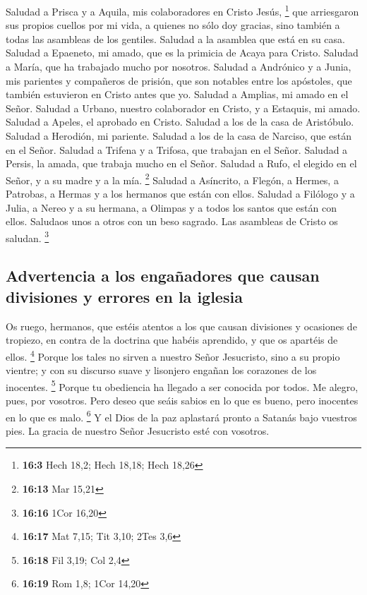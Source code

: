  Saludad a Prisca y a Aquila, mis colaboradores en Cristo
Jesús, \footnote{\textbf{16:3} Hech 18,2; Hech 18,18; Hech 18,26}
 que arriesgaron sus propios cuellos por mi vida, a
quienes no sólo doy gracias, sino también a todas las asambleas de los
gentiles.  Saludad a la asamblea que está en su casa.
Saludad a Epaeneto, mi amado, que es la primicia de Acaya para Cristo.
 Saludad a María, que ha trabajado mucho por nosotros.
 Saludad a Andrónico y a Junia, mis parientes y compañeros
de prisión, que son notables entre los apóstoles, que también estuvieron
en Cristo antes que yo.  Saludad a Amplias, mi amado en el
Señor.  Saludad a Urbano, nuestro colaborador en Cristo, y
a Estaquis, mi amado.  Saludad a Apeles, el aprobado en
Cristo. Saludad a los de la casa de Aristóbulo.  Saludad
a Herodión, mi pariente. Saludad a los de la casa de Narciso, que están
en el Señor.  Saludad a Trifena y a Trifosa, que trabajan
en el Señor. Saludad a Persis, la amada, que trabaja mucho en el Señor.
 Saludad a Rufo, el elegido en el Señor, y a su madre y a
la mía. \footnote{\textbf{16:13} Mar 15,21}  Saludad a
Asíncrito, a Flegón, a Hermes, a Patrobas, a Hermas y a los hermanos que
están con ellos.  Saludad a Filólogo y a Julia, a Nereo y
a su hermana, a Olimpas y a todos los santos que están con ellos.
 Saludaos unos a otros con un beso sagrado. Las asambleas
de Cristo os saludan. \footnote{\textbf{16:16} 1Cor 16,20}

\hypertarget{advertencia-a-los-engauxf1adores-que-causan-divisiones-y-errores-en-la-iglesia}{%
\subsection{Advertencia a los engañadores que causan divisiones y
errores en la
iglesia}\label{advertencia-a-los-engauxf1adores-que-causan-divisiones-y-errores-en-la-iglesia}}

 Os ruego, hermanos, que estéis atentos a los que causan
divisiones y ocasiones de tropiezo, en contra de la doctrina que habéis
aprendido, y que os apartéis de ellos. \footnote{\textbf{16:17} Mat
  7,15; Tit 3,10; 2Tes 3,6}  Porque los tales no sirven a
nuestro Señor Jesucristo, sino a su propio vientre; y con su discurso
suave y lisonjero engañan los corazones de los inocentes. \footnote{\textbf{16:18}
  Fil 3,19; Col 2,4}  Porque tu obediencia ha llegado a
ser conocida por todos. Me alegro, pues, por vosotros. Pero deseo que
seáis sabios en lo que es bueno, pero inocentes en lo que es malo.
\footnote{\textbf{16:19} Rom 1,8; 1Cor 14,20}  Y el Dios
de la paz aplastará pronto a Satanás bajo vuestros pies. La gracia de
nuestro Señor Jesucristo esté con vosotros.

